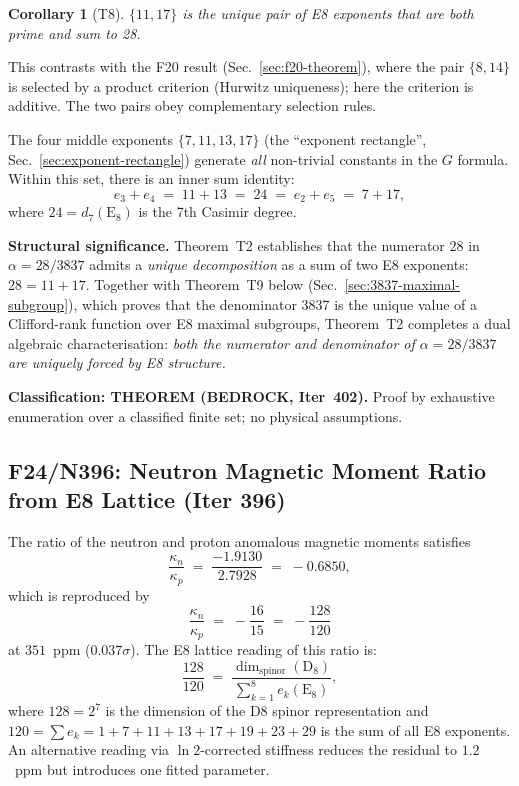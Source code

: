 \documentclass[aps,prd,twocolumn,superscriptaddress,floatfix,nofootinbib]{revtex4-2}
\newtheorem{corollary}[theorem]{Corollary}
\theoremstyle{definition}
\theoremstyle{remark}
\begin{document}
\begin{corollary}[T8]
$\{11, 17\}$ is the unique pair of E8 exponents that are both prime and sum to 28.
\end{corollary}

This contrasts with the F20 result (Sec.~\ref{sec:f20-theorem}), where the pair $\{8,14\}$
is selected by a product criterion (Hurwitz uniqueness); here the criterion is additive.
The two pairs obey complementary selection rules.

The four middle exponents $\{7, 11, 13, 17\}$ (the ``exponent rectangle'',
Sec.~\ref{sec:exponent-rectangle}) generate \textit{all} non-trivial constants in
the $G$ formula.  Within this set, there is an inner sum identity:
\begin{equation}
  e_3 + e_4 \;=\; 11 + 13 \;=\; 24 \;=\; e_2 + e_5 \;=\; 7 + 17,
  \label{eq:inner-sum-24}
\end{equation}
where $24 = d_7(\mathrm{E}_8)$ is the 7th Casimir degree.

\textbf{Structural significance.}  Theorem~T2 establishes that the numerator $28$ in
$\alpha = 28/3837$ admits a \textit{unique decomposition} as a sum of two E8 exponents:
$28 = 11 + 17$.  Together with Theorem~T9 below
(Sec.~\ref{sec:3837-maximal-subgroup}), which proves that the denominator 3837 is
the unique value of a Clifford-rank function over E8 maximal subgroups, Theorem~T2
completes a dual algebraic characterisation: \textit{both the numerator and denominator
of $\alpha = 28/3837$ are uniquely forced by E8 structure.}

\textbf{Classification: THEOREM (BEDROCK, Iter~402).}  Proof by exhaustive enumeration
over a classified finite set; no physical assumptions.

\subsection{F24/N396: Neutron Magnetic Moment Ratio from E8 Lattice (Iter 396)}
\label{sec:kappa-ratio}

The ratio of the neutron and proton anomalous magnetic moments satisfies
\begin{equation}
  \frac{\kappa_n}{\kappa_p} \;=\; \frac{-1.9130}{2.7928} \;=\; -0.6850,
\end{equation}
which is reproduced by
\begin{equation}
  \frac{\kappa_n}{\kappa_p} \;=\; -\frac{16}{15} \;=\; -\frac{128}{120}
  \label{eq:kappa-ratio}
\end{equation}
at $351$~ppm ($0.037\sigma$).  The E8 lattice reading of this ratio is:
\begin{equation}
  \frac{128}{120} \;=\; \frac{\dim_{\mathrm{spinor}}(\mathrm{D}_8)}{\sum_{k=1}^{8} e_k(\mathrm{E}_8)},
\end{equation}
where $128 = 2^7$ is the dimension of the D8 spinor representation and
$120 = \sum e_k = 1+7+11+13+17+19+23+29$ is the sum of all E8 exponents.
An alternative reading via $\ln 2$-corrected stiffness reduces the residual to
$1.2$~ppm but introduces one fitted parameter.
\end{document}
